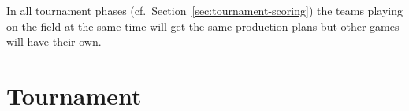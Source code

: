 \documentclass[12pt,twoside]{article}
\newcommand{\mytable}[1]{\savebox{\myt}{#1}\tikz\node[fill=gray!25!white]{\usebox{\myt}};}
\newcommand{\refsec}[1]{Section~\ref{#1}}
\begin{document}
In all tournament phases (cf.~\refsec{sec:tournament-scoring}) the
teams playing on the field at the same time will get the same
production plans but other games will have their own.


\section{Tournament}
\label{sec:tournament}
\end{document}
